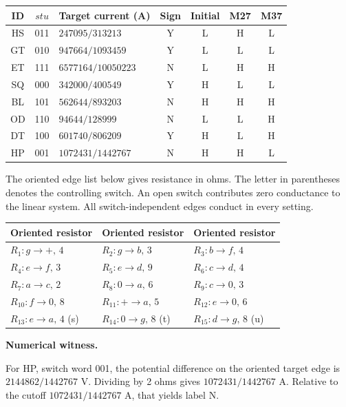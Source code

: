 \documentclass[12pt,letterpaper]{article}
\newcommand{\reading}[2]{\par\smallskip\textsf{\color{accent}\bfseries #1}\enspace #2\par}
\begin{document}
\begin{center}{\small\setlength{\tabcolsep}{4pt}\begin{tabularx}{\linewidth}{@{}ccYcccc@{}}\toprule
ID & $stu$ & Target current (A) & Sign & Initial & M27 & M37\\ \midrule
HS & 011 & $247095/313213$ & Y & L & H & L\\
GT & 010 & $947664/1093459$ & Y & L & L & L\\
ET & 111 & $6577164/10050223$ & N & L & H & H\\
SQ & 000 & $342000/400549$ & Y & H & L & L\\
BL & 101 & $562644/893203$ & N & H & H & H\\
OD & 110 & $94644/128999$ & N & L & L & H\\
DT & 100 & $601740/806209$ & Y & H & L & H\\
HP & 001 & $1072431/1442767$ & N & H & H & L\\
\bottomrule\end{tabularx}}\end{center}

The oriented edge list below gives resistance in ohms. The letter in parentheses denotes the controlling switch. An open switch contributes zero conductance to the linear system. All switch-independent edges conduct in every setting.

\begin{center}{\footnotesize\setlength{\tabcolsep}{4pt}\begin{tabularx}{\linewidth}{@{}YYY@{}}\toprule
Oriented resistor & Oriented resistor & Oriented resistor\\ \midrule
$R_{1}: g\!\to\!+,\,4$ & $R_{2}: g\!\to\!b,\,3$ & $R_{3}: b\!\to\!f,\,4$\\
$R_{4}: e\!\to\!f,\,3$ & $R_{5}: e\!\to\!d,\,9$ & $R_{6}: c\!\to\!d,\,4$\\
$R_{7}: a\!\to\!c,\,2$ & $R_{8}: 0\!\to\!a,\,6$ & $R_{9}: c\!\to\!0,\,3$\\
$R_{10}: f\!\to\!0,\,8$ & $R_{11}: +\!\to\!a,\,5$ & $R_{12}: e\!\to\!0,\,6$\\
$R_{13}: e\!\to\!a,\,4$ (s) & $R_{14}: 0\!\to\!g,\,8$ (t) & $R_{15}: d\!\to\!g,\,8$ (u)\\
\bottomrule\end{tabularx}}\end{center}

\reading{Numerical witness.}{} For HP, switch word 001, the potential difference on the oriented target edge is $2144862/1442767$ V. Dividing by 2 ohms gives $1072431/1442767$ A. Relative to the cutoff $1072431/1442767$ A, that yields label N.
\end{document}
